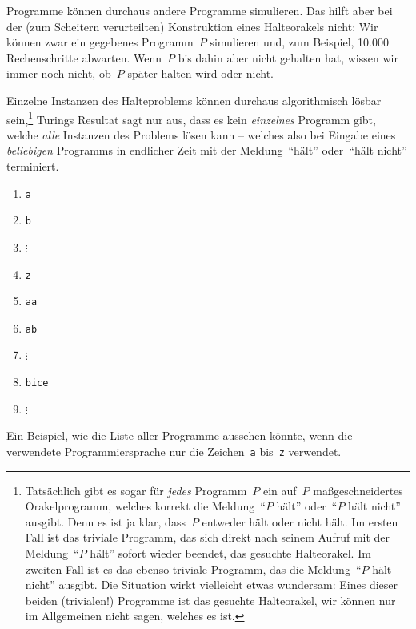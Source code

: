 \documentclass[twoside]{../zirkelblatt1415}
\theoremstyle{definition}
\theoremstyle{plain}
\theoremstyle{remark}
\begin{document}
Programme können durchaus andere Programme simulieren. Das hilft
aber bei der (zum Scheitern verurteilten) Konstruktion eines Halteorakels
nicht: Wir können zwar ein gegebenes Programm~$P$ simulieren und, zum Beispiel,
10.000 Rechenschritte abwarten. Wenn~$P$ bis dahin aber nicht gehalten hat,
wissen wir immer noch nicht, ob~$P$ später halten wird oder nicht.

Einzelne Instanzen des Halteproblems können durchaus algorithmisch
lösbar sein,\footnote{Tatsächlich gibt es sogar für \emph{jedes} Programm~$P$
ein auf~$P$ maßgeschneidertes Orakelprogramm, welches korrekt die Meldung~"`$P$
hält"' oder~"`$P$ hält nicht"' ausgibt. Denn es ist ja klar, dass~$P$ entweder
hält oder nicht hält.  Im ersten Fall ist das triviale Programm, das sich
direkt nach seinem Aufruf mit der Meldung~"`$P$ hält"' sofort wieder beendet,
das gesuchte Halteorakel. Im zweiten Fall ist es das ebenso triviale Programm,
das die Meldung~"`$P$ hält nicht"' ausgibt. Die Situation wirkt vielleicht
etwas wundersam: Eines dieser beiden (trivialen!) Programme ist das gesuchte
Halteorakel, wir können nur im Allgemeinen nicht sagen, welches es ist.}
Turings Resultat sagt nur aus, dass es kein \emph{einzelnes}
Programm gibt, welche \emph{alle} Instanzen des Problems lösen kann -- welches
also bei Eingabe eines \emph{beliebigen} Programms in endlicher Zeit mit der
Meldung~"`hält"' oder~"`hält nicht"' terminiert.

\begin{table}[t]
  \begin{enumerate}
    \item[1.] \texttt{a} \\[-2.0em]
    \item[2.] \texttt{b} \\[-2.0em]
    \item[] $\vdots$ \\[-2.0em]
    \item[26.] \texttt{z} \\[-2.0em]
    \item[27.] \texttt{aa} \\[-2.0em]
    \item[28.] \texttt{ab} \\[-2.0em]
    \item[] $\vdots$ \\[-2.0em]
    \item[41320.] \texttt{bice} \\[-2.0em]
    \item[] $\vdots$
  \end{enumerate}
  \centering
  \caption{\label{tafel:liste-aller-programme}Ein Beispiel, wie die Liste aller
  Programme aussehen könnte, wenn die verwendete Programmiersprache nur die
  Zeichen~\texttt{a} bis~\texttt{z} verwendet.}
\end{table}
\end{document}
